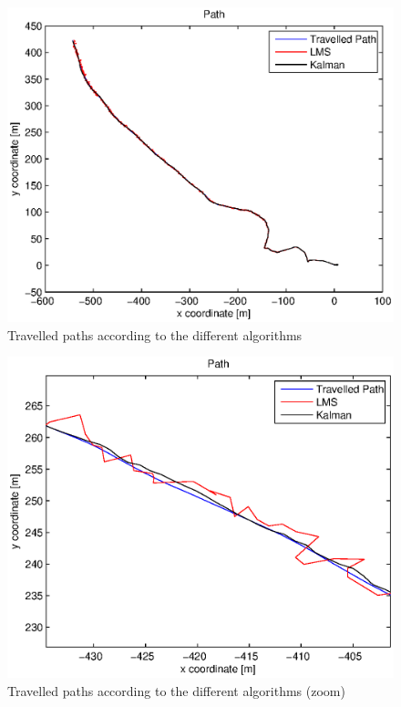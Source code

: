 \documentclass[a4paper]{article}        %
\begin{document}
			\begin{figure}[H]
				\centering
				\includegraphics[width=\textwidth]{images/tracking_algorithms.eps}
				\caption{Travelled paths according to the different algorithms}
				\label{fig:paths}
			\end{figure}

		
			
			\begin{figure}[H]
				\centering
				\includegraphics[width=\textwidth]{images/tracking_algorithms_zoom.eps}
				\caption{Travelled paths according to the different algorithms (zoom)}
				\label{fig:paths_zoom}
			\end{figure}
\end{document}
